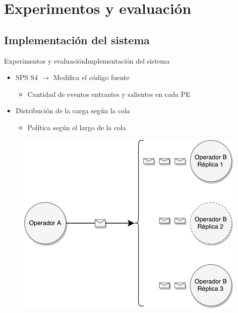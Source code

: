 \section{Experimentos y evaluación}
\subsection*{Implementación del sistema}
\begin{frame}{Experimentos y evaluación}{Implementación del sistema}
\begin{itemize}
\item SPS S4 $\rightarrow$ Modifica el código fuente
	\begin{itemize}
		\item Cantidad de eventos entrantes y salientes en cada PE
	\end{itemize}
\item Distribución de la carga según la cola
	\begin{itemize}
		\item Política según el largo de la cola
	\end{itemize}
\end{itemize}

\begin{figure}
  \center
    \includegraphics[scale=0.35]{images/DistribucionCarga-I.pdf}
\end{figure}
\end{frame}

